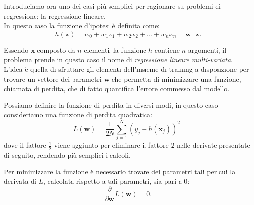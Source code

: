 \documentclass[../../main.tex]{subfiles}
\begin{document}
    Introduciamo ora uno dei casi più semplici per ragionare su problemi di regressione: la regressione lineare.\\
    In questo caso la funzione d'ipotesi è definita come:
    \begin{equation}
        h(\boldsymbol{x}) = w_0 + w_1x_1 + w_2x_2 + \dots + w_nx_n = \boldsymbol{w}^\top \boldsymbol{x}.
        \label{eqn:linearhypotes}   
    \end{equation}

    Essendo $\boldsymbol{x}$  composto da $n$ elementi, la funzione $h$ contiene $n$ argomenti, il problema prende in questo caso il nome di \textit{regressione lineare multi-variata}. L'idea è quella di sfruttare gli elementi dell'insieme di training a disposizione per trovare un vettore dei parametri $\boldsymbol{w}$ che permetta di minimizzare  una funzione, chiamata di perdita, che di fatto quantifica l'errore commesso dal modello.
    
    Possiamo definire la funzione di perdita in diversi modi, in questo caso consideriamo una funzione di perdita quadratica:
    \begin{equation}
        L(\boldsymbol{w}) = \frac{1}{2N} \sum_{j=1}^N(y_j - h(\boldsymbol{x}_j))^2,
        \label{eqn:lossquadratica}
    \end{equation}
    dove il fattore $\frac{1}{2}$ viene aggiunto per eliminare il fattore $2$ nelle derivate presentate di seguito, rendendo più semplici i calcoli.

    Per minimizzare la funzione è necessario trovare dei parametri tali per cui la derivata di $L$, calcolata rispetto a tali parametri, sia pari a 0:
    \[\frac{\partial}{\partial \boldsymbol{w}} L(\boldsymbol{w}) = 0.\]
\end{document}
